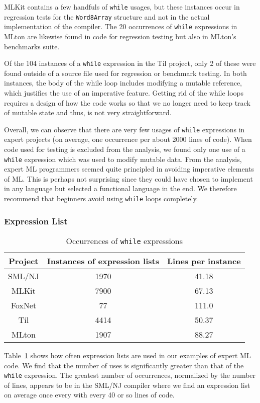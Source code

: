 \documentclass[12pt,abstracton]{scrartcl}
\begin{document}
MLKit contains a few handfuls of \texttt{while} usages, but these instances
occur in regression tests for the \texttt{Word8Array} structure and not in the actual implementation of the compiler.
The 20 occurrences of \texttt{while} expressions in MLton are likewise found in code for regression testing but
also in MLton's benchmarks suite.

Of the 104 instances of a \texttt{while} expression in the Til project,
only 2 of these were found outside of a source file used for regression or benchmark testing.
In both instances, the body of the while loop includes modifying a mutable reference, which justifies the use of
an imperative feature. Getting rid of the while loops requires a design of how the code works so
that we no longer need to keep track of mutable state and thus, is not very straightforward.

Overall, we can observe that there are very few usages of \texttt{while} expressions
in expert projects (on average, one occurrence per about 2000 lines of code).
When code used for testing is excluded from the analysis, we found only one use
of a \texttt{while} expression which was used to modify mutable data.
From the analysis, expert ML programmers seemed quite principled in avoiding imperative
elements of ML. This is perhaps not surprising since they could have chosen
to implement in any language but selected a functional language in the end.
We therefore recommend that beginners avoid using \texttt{while} loops completely.
\subsubsection{Expression List}
\begin{table}[h!]
\centering
\begin{tabular}{|c||c|c|}
\hline
Project & Instances of expression lists & Lines per instance \\ \hline\hline
SML/NJ & 1970 & 41.18 \\ 
MLKit & 7900 & 67.13 \\
FoxNet & 77 & 111.0 \\
Til & 4414 & 50.37 \\
MLton & 1907 & 88.27 \\ \hline
\end{tabular}
\caption{Occurrences of \texttt{while} expressions}
\label{table:explist}
\end{table}
Table~\ref{table:explist} shows how often expression lists are used in our
examples of expert ML code. We find that the number of uses is significantly
greater than that of the \texttt{while} expression. The greatest number
of occurrences, normalized by the number of lines, appears to be in the SML/NJ
compiler where we find an expression list on average once every with every
40 or so lines of code.
\end{document}

